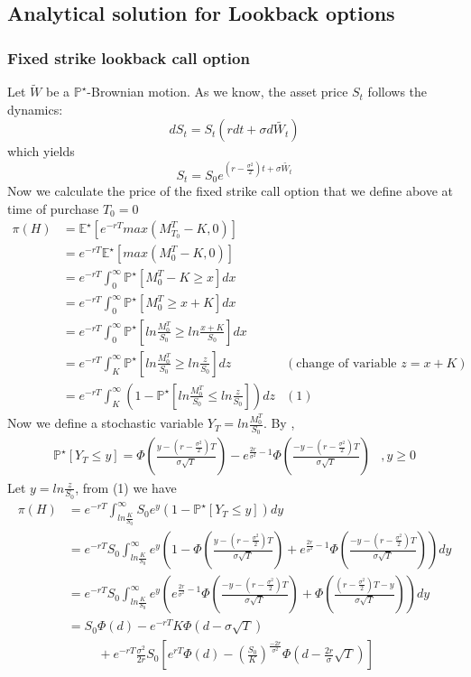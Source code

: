 \documentclass{article}
\begin{document}
\subsection{Analytical solution for Lookback options
}
\subsubsection{Fixed strike lookback call option
}
Let $\widetilde{W}$ be a $\mathbb{P}^{\star}$-Brownian motion. As we know, the asset price $S_t$ follows the dynamics:
\[
dS_t=S_t(rdt + \sigma d \widetilde{W_t})
\]
which yields
\[
S_t=S_0 e^{(r - \frac{\sigma^2}{2})t + \sigma \widetilde{W_t}}
\]
Now we calculate the price of the fixed strike call option that we define above at time of purchase $T_0=0$
\begin{align*}
\pi(H) 	&= \mathbb{E^{\star}}[e^{-rT} max(M_{T_0}^T - K, 0)] \\
			&= e^{-rT} \mathbb{E^{\star}}[max(M_{0}^T - K, 0)] \\
			&= e^{-rT} \int_{0}^{\infty} \mathbb{P}^{\star}[M_{0}^T - K \geq x]dx \\
			&= e^{-rT} \int_{0}^{\infty} \mathbb{P}^{\star}[M_{0}^T \geq x+K]dx \\
			&= e^{-rT} \int_{0}^{\infty} \mathbb{P}^{\star}[ln \frac{M_{0}^T}{S_0} \geq ln \frac{x+K}{S_0}]dx \\
			&= e^{-rT} \int_{K}^{\infty} \mathbb{P}^{\star}[ln \frac{M_{0}^T}{S_0} \geq ln \frac{z}{S_0}]dz &(\text{change of variable } z=x+K) \\
			&= e^{-rT} \int_{K}^{\infty} ( 1 - \mathbb{P}^{\star}[ln \frac{M_{0}^T}{S_0} \leq ln \frac{z}{S_0}])dz &(1)
\end{align*}
Now we define a stochastic variable $Y_T= ln \frac{M_{0}^{T}}{S_0}$. By \cite{Peter1},
\begin{align*}
\mathbb{P}^{\star}[Y_T \leq y]= \Phi \left(\frac{y-(r-\frac{\sigma^2}{2})T}{\sigma\sqrt{T}} \right) - e^{\frac{2r}{\sigma^2} - 1} \Phi \left(\frac{-y-(r-\frac{\sigma^2}{2})T}{\sigma\sqrt{T}} \right)
&, y \geq 0
\end{align*}
Let $y=ln\frac{z}{S_0}$, from (1) we have
\begin{align*}
\pi(H) 	&= e^{-rT} \int_{ln\frac{K}{S_0}}^{\infty} S_0e^y( 1 - \mathbb{P}^{\star}[Y_T \leq y])dy \\
			&= e^{-rT}S_0 \int_{ln\frac{K}{S_0}}^{\infty} e^y \left( 1 -  
			\Phi \left(\frac{y-(r-\frac{\sigma^2}{2})T}{\sigma\sqrt{T}} \right) + e^{\frac{2r}{\sigma^2} - 1} \Phi \left(\frac{-y-(r-\frac{\sigma^2}{2})T}{\sigma\sqrt{T}} \right)
			\right) dy \\
			&= e^{-rT}S_0 \int_{ln\frac{K}{S_0}}^{\infty} e^y \left( 
			e^{\frac{2r}{\sigma^2} - 1} \Phi \left(\frac{-y-(r-\frac{\sigma^2}{2})T}{\sigma\sqrt{T}} \right)
			+ \Phi \left(\frac{(r-\frac{\sigma^2}{2})T - y}{\sigma\sqrt{T}} \right)
			\right) dy \\
			&= S_0 \Phi(d) - e^{-rT}K \Phi(d - \sigma \sqrt{T} ) \\
			&\hspace{1cm} + e^{-rT}\frac{\sigma^2}{2r}S_0 \left[
			e^{rT}\Phi(d) - \left(\frac{S_0}{K}\right)^{\frac{-2r}{\sigma^2}} \Phi\left(d- \frac{2r}{\sigma}\sqrt{T}\right)
			\right]
\end{align*}
\end{document}
